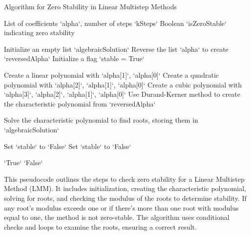 \begin{algorithm}
   \caption{Algorithm for Zero Stability in Linear Multistep Methods}
   \label{alg:zero_stability}
   
   \begin{algorithmic}[1] %
   
   \REQUIRE List of coefficients `alpha`, number of steps `kSteps`
   \ENSURE Boolean `isZeroStable` indicating zero stability
   
   \STATE Initialize an empty list `algebraicSolution`
   \STATE Reverse the list `alpha` to create `reversedAlpha`
   \STATE Initialize a flag `stable = True`
   
       \STATE Create a linear polynomial with `alpha[1]`, `alpha[0]`
       \STATE Create a quadratic polynomial with `alpha[2]`, `alpha[1]`, `alpha[0]`
       \STATE Create a cubic polynomial with `alpha[3]`, `alpha[2]`, `alpha[1]`, `alpha[0]`
   \ELSE
       \STATE Use Durand-Kerner method to create the characteristic polynomial from `reversedAlpha`
   \ENDIF
   
   \STATE Solve the characteristic polynomial to find roots, storing them in `algebraicSolution`
   
           \STATE Set `stable` to `False`
           \STATE Set `stable` to `False`
       \ENDIF
   \ENDFOR
   
       \RETURN `True`
   \ELSE
       \RETURN `False`
   \ENDIF
   
   \end{algorithmic}
   \end{algorithm}

\newpage
   This pseudocode outlines the steps to check zero stability for a Linear Multistep Method (LMM). It includes initialization, creating the characteristic polynomial, solving for roots, and checking the modulus of the roots to determine stability. If any root's modulus exceeds one or if there's more than one root with modulus equal to one, the method is not zero-stable. The algorithm uses conditional checks and loops to examine the roots, ensuring a correct result.

